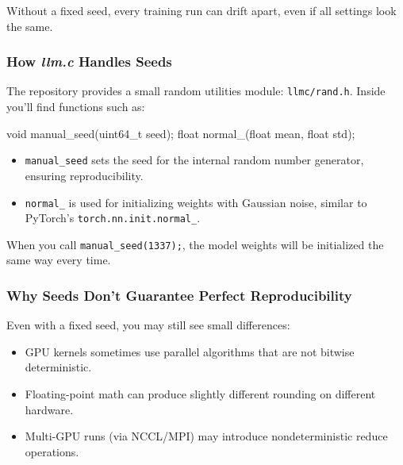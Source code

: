 \documentclass[
  letterpaper,
  DIV=11,
  numbers=noendperiod]{scrreprt}
\newenvironment{Shaded}{\begin{snugshade}}{\end{snugshade}}
\newcommand{\DataTypeTok}[1]{\textcolor[rgb]{0.68,0.00,0.00}{#1}}
\newcommand{\NormalTok}[1]{\textcolor[rgb]{0.00,0.23,0.31}{#1}}
\newcommand{\OperatorTok}[1]{\textcolor[rgb]{0.37,0.37,0.37}{#1}}
\providecommand{\tightlist}{%
  \setlength{\itemsep}{0pt}\setlength{\parskip}{0pt}}
\begin{document}
Without a fixed seed, every training run can drift apart, even if all
settings look the same.

\subsubsection{\texorpdfstring{How \emph{llm.c} Handles
Seeds}{How llm.c Handles Seeds}}\label{how-llm.c-handles-seeds}

The repository provides a small random utilities module:
\texttt{llmc/rand.h}. Inside you'll find functions such as:

\begin{Shaded}
\begin{Highlighting}[]
\DataTypeTok{void}\NormalTok{ manual\_seed}\OperatorTok{(}\DataTypeTok{uint64\_t}\NormalTok{ seed}\OperatorTok{);}
\DataTypeTok{float}\NormalTok{ normal\_}\OperatorTok{(}\DataTypeTok{float}\NormalTok{ mean}\OperatorTok{,} \DataTypeTok{float}\NormalTok{ std}\OperatorTok{);}
\end{Highlighting}
\end{Shaded}

\begin{itemize}
\tightlist
\item
  \texttt{manual\_seed} sets the seed for the internal random number
  generator, ensuring reproducibility.
\item
  \texttt{normal\_} is used for initializing weights with Gaussian
  noise, similar to PyTorch's \texttt{torch.nn.init.normal\_}.
\end{itemize}

When you call \texttt{manual\_seed(1337);}, the model weights will be
initialized the same way every time.

\subsubsection{Why Seeds Don't Guarantee Perfect
Reproducibility}\label{why-seeds-dont-guarantee-perfect-reproducibility}

Even with a fixed seed, you may still see small differences:

\begin{itemize}
\tightlist
\item
  GPU kernels sometimes use parallel algorithms that are not bitwise
  deterministic.
\item
  Floating-point math can produce slightly different rounding on
  different hardware.
\item
  Multi-GPU runs (via NCCL/MPI) may introduce nondeterministic reduce
  operations.
\end{itemize}
\end{document}
